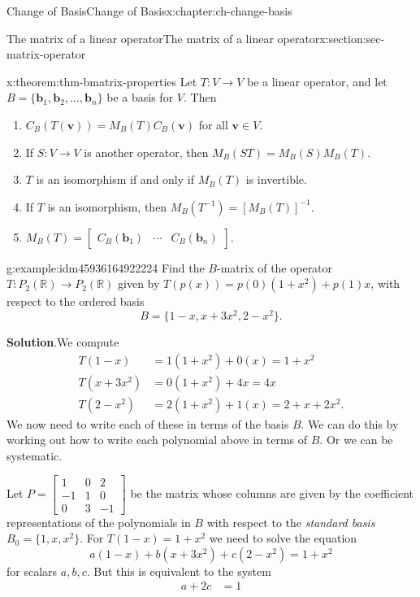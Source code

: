 \documentclass[oneside,10pt,]{book}
\newcommand{\blocktitlefont}{\relax}
\numberwithin{equation}{section}
\newcommand{\bbm}{\begin{bmatrix}}
\newcommand{\ebm}{\end{bmatrix}}
\newcommand{\R}{\mathbb{R}}
\newcommand{\vv}{\mathbf{v}}
\newcommand{\basis}[2]{\{\mathbf{#1}_1,\mathbf{#1}_2,\ldots,\mathbf{#1}_{#2}\}}
\newcommand{\amp}{&}
\begin{document}
\begin{chapterptx}{Change of Basis}{}{Change of Basis}{}{}{x:chapter:ch-change-basis}
\begin{sectionptx}{The matrix of a linear operator}{}{The matrix of a linear operator}{}{}{x:section:sec-matrix-operator}
\begin{theorem}{}{}{x:theorem:thm-bmatrix-properties}
Let \(T:V\to V\) be a linear operator, and let \(B=\basis{b}{n}\) be a basis for \(V\). Then%
\begin{enumerate}
\item{}\(C_B(T(\vv))=M_B(T)C_B(\vv)\) for all \(\vv\in V\).%
\item{}If \(S:V\to V\) is another operator, then \(M_B(ST)=M_B(S)M_B(T)\).%
\item{}\(T\) is an isomorphism if and only if \(M_B(T)\) is invertible.%
\item{}If \(T\) is an isomorphism, then \(M_B(T^{-1}) = [M_B(T)]^{-1}\).%
\item{}\(M_B(T)=\bbm C_B(\mathbf{b}_1) \amp \cdots \amp C_B(\mathbf{b}_n)\ebm\).%
\end{enumerate}
%
\end{theorem}
\begin{example}{}{g:example:idm45936164922224}%
Find the \(B\)-matrix of the operator \(T:P_2(\R)\to P_2(\R)\) given by \(T(p(x))=p(0)(1+x^2)+p(1)x\), with respect to the ordered basis%
\begin{equation*}
B = \{1-x, x+3x^2, 2-x^2\}\text{.}
\end{equation*}
%
\par\smallskip%
\noindent\textbf{\blocktitlefont Solution}.\label{g:solution:idm45936164919744}{}\hypertarget{g:solution:idm45936164919744}{}\quad{}We compute%
\begin{align*}
T(1-x) \amp = 1(1+x^2)+0(x) = 1+x^2\\
T(x+3x^2) \amp = 0(1+x^2)+4x=4x\\
T(2-x^2) \amp = 2(1+x^2)+1(x) = 2+x+2x^2\text{.}
\end{align*}
We now need to write each of these in terms of the basis \(B\). We can do this by working out how to write each polynomial above in terms of \(B\). Or we can be systematic.%
\par
Let \(P = \bbm 1\amp 0\amp 2\\-1\amp 1\amp 0\\0\amp 3\amp -1\ebm\) be the matrix whose columns are given by the coefficient representations of the polynomials in \(B\) with respect to the \emph{standard basis} \(B_0=\{1,x,x^2\}\). For \(T(1-x)=1+x^2\) we need to solve the equation%
\begin{equation*}
a(1-x)+b(x+3x^2)+c(2-x^2)=1+x^2
\end{equation*}
for scalars \(a,b,c\). But this is equivalent to the system%
\begin{align*}
a+2c \amp =1\\

\end{align*}
\end{example}
\end{sectionptx}
\end{chapterptx}
\end{document}
